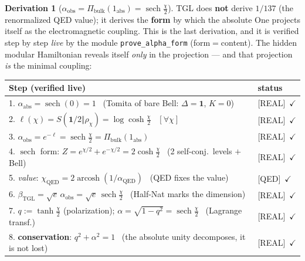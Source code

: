 \documentclass[11pt]{article}
\newcommand{\bTGL}{\beta_{\mathrm{TGL}}}\newcommand{\Msun}{M_{\odot}}\newcommand{\TGL}{\mathrm{TGL}}
\theoremstyle{definition}\newtheorem{deriv}{Derivation}
\begin{document}
\begin{deriv}[$\alpha_{\mathrm{obs}}=\Pi_{\mathrm{bulk}}(1_{\mathrm{abs}})=\operatorname{sech}\tfrac\chi2$]

TGL does \textbf{not} derive $1/137$ (the renormalized QED value); it derives the \textbf{form} by which the absolute One projects itself as the electromagnetic coupling. This is the last derivation, and it is verified step by step \emph{live} by the module \texttt{prove\_alpha\_form} (form$=$content). The hidden modular Hamiltonian reveals itself \emph{only} in the projection --- and that projection \emph{is} the minimal coupling:

\begin{center}\small\begin{tabular}{p{} l}\hline

\textbf{Step (verified live)} & \textbf{status} \\\hline

1. $\alpha_{\mathrm{abs}}=\operatorname{sech}(0)=1$ \ (Tomita of bare Bell: $\Delta=\mathbf 1$, $K=0$) & \textsf{[REAL]}~$\checkmark$ \\

2. $\ell(\chi)=S(\mathbf 1/2\Vert\rho_\chi)=\log\cosh\tfrac\chi2$ \ $[\forall\chi]$ & \textsf{[REAL]}~$\checkmark$ \\

3. $\alpha_{\mathrm{obs}}=e^{-\ell}=\operatorname{sech}\tfrac\chi2=\Pi_{\mathrm{bulk}}(1_{\mathrm{abs}})$ & \textsf{[REAL]}~$\checkmark$ \\

4. $\operatorname{sech}$ form: $Z=e^{\chi/2}+e^{-\chi/2}=2\cosh\tfrac\chi2$ \ (2 self-conj.\ levels $+$ Bell) & \textsf{[REAL]}~$\checkmark$ \\

5. \emph{value}: $\chi_{\mathrm{QED}}=2\operatorname{arcosh}(1/\alpha_{\mathrm{QED}})$ \ (QED fixes the value) & \textsf{[QED]}~$\checkmark$ \\

6. $\bTGL=\sqrt e\,\alpha_{\mathrm{obs}}=\sqrt e\,\operatorname{sech}\tfrac\chi2$ \ (Half-Nat marks the dimension) & \textsf{[REAL]}~$\checkmark$ \\

7. $q:=\tanh\tfrac\chi2$ (polarization); $\alpha=\sqrt{1-q^2}=\operatorname{sech}\tfrac\chi2$ \ (Lagrange transf.) & \textsf{[REAL]}~$\checkmark$ \\

8. \textbf{conservation}: $q^2+\alpha^2=1$ \ (the absolute unity decomposes, it is not lost) & \textsf{[REAL]}~$\checkmark$ \\


\end{tabular}
\end{center}
\end{deriv}
\end{document}
